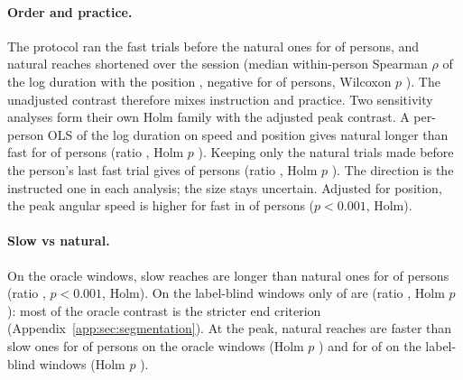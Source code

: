 \paragraph{Order and practice.} The protocol ran the fast trials before the natural ones for
 of  persons, and natural reaches shortened over the session
(median within-person Spearman $\rho$ of the log duration with the position , negative for
 of  persons, Wilcoxon $p$ ). The unadjusted
contrast therefore mixes instruction and practice. Two sensitivity analyses form their own Holm family with the
adjusted peak contrast. A per-person OLS of the log duration on speed and position gives natural longer than fast
for  of  persons (ratio
, Holm $p$ ). Keeping only the
natural trials made before the person's last fast trial gives  of
 persons (ratio , Holm $p$
). The direction is the instructed one in each analysis; the size
stays uncertain. Adjusted for position, the peak angular speed is higher for fast in
 of  persons ($p < 0.001$,
Holm).

\paragraph{Slow vs natural.} On the oracle windows, slow reaches are longer than natural ones for
 of  persons (ratio
, $p < 0.001$, Holm). On the label-blind windows only
 of  are (ratio
, Holm $p$ ): most of the
oracle contrast is the stricter end criterion (Appendix~\ref{app:sec:segmentation}). At the peak, natural reaches
are faster than slow ones for  of
 persons on the oracle windows (Holm $p$
) and for  of
 on the label-blind windows (Holm $p$ ).

